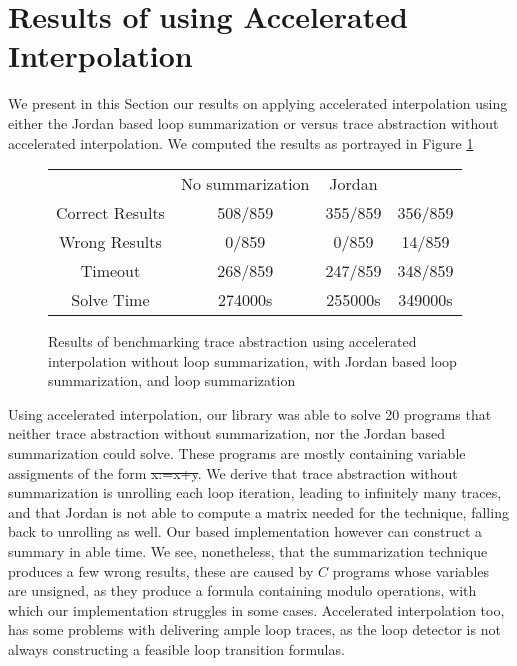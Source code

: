\section{Results of using Accelerated Interpolation}
We present in this Section our results on applying accelerated interpolation using either the Jordan based loop summarization or \qvasr versus trace abstraction without accelerated interpolation. We computed the results as portrayed in Figure \ref{table_acc}
\begin{figure}[H]
	\centering
		\begin{tabular}{cccc}
			\toprule
			& No summarization & Jordan & \qvasr \\
			\cmidrule{1-4}
			Correct Results & 508/859 & 355/859 & 356/859\\
			Wrong Results & 0/859 & 0/859 & 14/859\\
			Timeout & 268/859 & 247/859 & 348/859 \\
			Solve Time &  274000s & 255000s & 349000s
		\end{tabular}
	\caption{Results of benchmarking trace abstraction using accelerated interpolation without loop summarization, with Jordan based loop summarization, and \qvasr loop summarization}
	\label{table_acc}
\end{figure}
Using accelerated interpolation, our \qvasr library was able to solve 20 programs that neither trace abstraction without summarization, nor the Jordan based summarization could solve. These programs are mostly containing variable assigments of the form \st{x:=x+y}. We derive that trace abstraction without summarization is unrolling each loop iteration, leading to infinitely many traces, and that Jordan is not able to compute a matrix needed for the technique, falling back to unrolling as well. Our \qvasr based implementation however can construct a summary in able time. We see, nonetheless, that the \qvasr summarization technique produces a few wrong results, these are caused by $C$ programs whose variables are unsigned, as they produce a formula containing modulo operations, with which our \qvasr implementation struggles in some cases. Accelerated interpolation too, has some problems with delivering ample loop traces, as the loop detector is not always constructing a feasible loop transition formulas.

